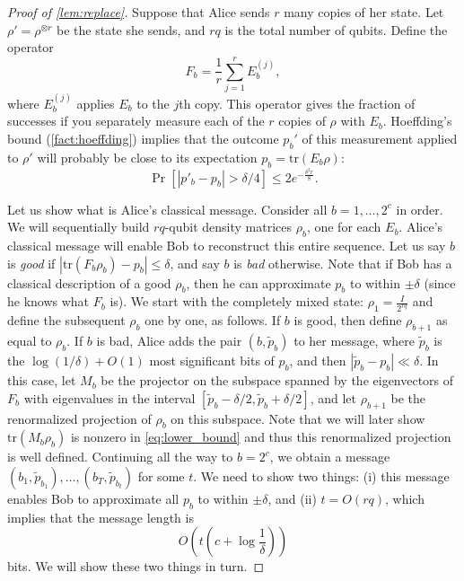 \begin{proof}[Proof of \cref{lem:replace}]
    Suppose that Alice sends $r$ many copies of her state.
    Let $\rho'=\rho^{\otimes r}$ be the state she sends, and $r q$ is the total number of qubits. Define the operator
    \[
        F_b=\frac{1}{r}\sum_{j=1}^r E_b^{(j)},
    \]
    where $E_b^{(j)}$ applies $E_b$ to the $j$th copy. This operator gives the fraction of successes if you separately measure each of the $r$ copies of $\rho$ with $E_b$. Hoeffding's bound (\cref{fact:hoeffding}) implies that the outcome $p_b'$ of this measurement applied to $\rho'$ will probably be close to its expectation $p_b=\mathrm{tr}(E_b\rho)$:
    \begin{equation}\label{eq:use_chernoff}
        \Pr[|p'_b-p_b|>\delta/4]\leq 2 e^{-\frac{\delta^2 r}{8}}.
    \end{equation}

    Let us show what is Alice's classical message. Consider all $b=1,\ldots,2^c$ in order. We will sequentially build $rq$-qubit density matrices $\rho_b$, one for each $E_b$.
    Alice's classical message will enable Bob to reconstruct this entire sequence. Let us say $b$ is \emph{good} if $|\mathrm{tr}(F_b \rho_b)-p_b| \leq \delta$, and say $b$ is \emph{bad} otherwise. Note that if Bob has a classical description of a good $\rho_b$, then he can approximate $p_b$ to within $\pm \delta$ (since he knows what $F_b$ is). We start with the completely mixed state: $\rho_1=\frac{I}{2^{rq}}$ and define the subsequent $\rho_b$ one by one, as follows. If $b$ is good, then define $\rho_{b+1}$ as equal to $\rho_b$. If $b$ is bad, Alice adds the pair $(b,\widetilde{p}_b)$ to her message, where $\widetilde{p}_b$ is the $\log(1/\delta)+O(1)$ most significant bits of $p_b$, and then $|\widetilde{p}_b-p_b| \ll \delta$. In this case, let $M_b$ be the projector on the subspace spanned by the eigenvectors of $F_b$ with eigenvalues in the interval $[\widetilde{p}_b-\delta/2,\widetilde{p}_b+\delta/2]$, and let $\rho_{b+1}$ be the renormalized projection of $\rho_b$ on this subspace. Note that we will later show $\mathrm{tr}(M_b \rho_b)$ is nonzero in \cref{eq:lower_bound} and thus this renormalized projection is well defined. Continuing all the way to $b=2^c$, we obtain a message $(b_1,\widetilde{p}_{b_1}),\ldots,(b_T,\widetilde{p}_{b_t})$ for some $t$. We need to show two things: (i) this message enables Bob to approximate all $p_b$ to within $\pm \delta$, and (ii) $t=O(rq)$, which implies that the message length is 
    \begin{equation}\label{eq:total_length}
        O\left(t \left( c+\log \frac{1}{\delta} \right) \right)
    \end{equation}    
    bits. We will show these two things in turn.


\end{proof}

